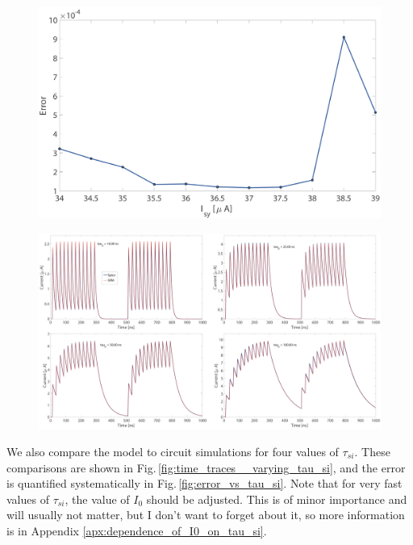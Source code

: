 \documentclass[]{article}
\begin{document}
\begin{figure}[t!]
\centering
\includegraphics[width=17.2cm]{_error_vs_Isy.pdf}
\end{figure}

\begin{figure}[t!]
\centering
\includegraphics[width=17.2cm]{_time_traces__varying_tau_si.pdf}
\end{figure}
We also compare the model to circuit simulations for four values of $\tau_{si}$. These comparisons are shown in Fig.\,\ref{fig:time_traces__varying_tau_si}, and the error is quantified systematically in Fig.\,\ref{fig:error_vs_tau_si}. Note that for very fast values of $\tau_{si}$, the value of $I_0$ should be adjusted. This is of minor importance and will usually not matter, but I don't want to forget about it, so more information is in Appendix \ref{apx:dependence_of_I0_on_tau_si}.
\end{document}
